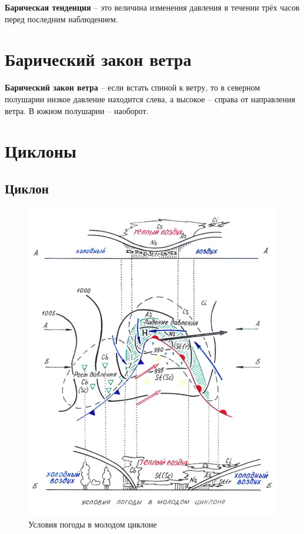 \documentclass[a4paper, 12pt, twoside, final, book, russian, fittopage, cyremdash, openright]{ncc}
\begin{document}
\textbf{Барическая тенденция} \--- это
величина изменения давления в течении трёх часов перед последним
наблюдением.

\section{Барический закон ветра}
\label{sec:baric_wind_law}

\textbf{Барический закон ветра} \---
если встать спиной к ветру, то в северном полушарии низкое давление
находится слева, а высокое \--- справа от направления ветра. В южном
полушарии \--- наоборот.

\section{Циклоны}

\subsection{Циклон}
\label{sec:cyclon}

\begin{figure}[htb]
   \centering
   \includegraphics[scale=1.0]{03_cyclon.pdf}
   \caption{Условия погоды в молодом циклоне}
   \label{fig:03_cyclon}
\end{figure}
\end{document}

